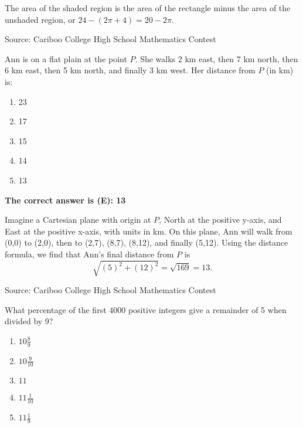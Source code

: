 \documentclass{article}
\begin{document}
The area of the shaded region is the area of the rectangle minus the area of the unshaded region, or $24-(2\pi+4)=20-2\pi$.

\vskip 1.5cm


\scriptsize
Source: Cariboo College High School Mathematics Contest

\normalsize
Ann is on a flat plain at the point $P$. She walks 2 km east, then 7 km north, then 6 km east, then 5 km north, and finally 3 km west. Her distance from $P$ (in km) is:
\begin{enumerate}[noitemsep,topsep=0mm,leftmargin=*,widest=D,label=\Alph*)]
	\item 23
	\item 17
	\item 15
	\item 14
	\item 13
\end{enumerate}

\textbf{The correct answer is (E): 13}

Imagine a Cartesian plane with origin at $P$, North at the positive y-axis, and East at the positive x-axis, with units in km. On this plane, Ann will walk from (0,0) to (2,0), then to (2,7), (8,7), (8,12), and finally (5,12). Using the distance formula, we find that Ann's final distance from $P$ is
\[
\sqrt{(5)^2+(12)^2} = \sqrt{169} = 13.
\]

\vskip 1.5cm


\scriptsize
Source: Cariboo College High School Mathematics Contest

\normalsize
What percentage of the first 4000 positive integers give a remainder of 5 when divided by 9?
\begin{enumerate}[itemsep=0mm,topsep=0mm,leftmargin=*,widest=D,label=\Alph*)]
	\item $10 \frac{8}{9}$
	\item $10 \frac{9}{10}$
	\item $11$
	\item $11 \frac{1}{10}$
	\item $11 \frac{1}{9}$
\end{enumerate}
\end{document}
